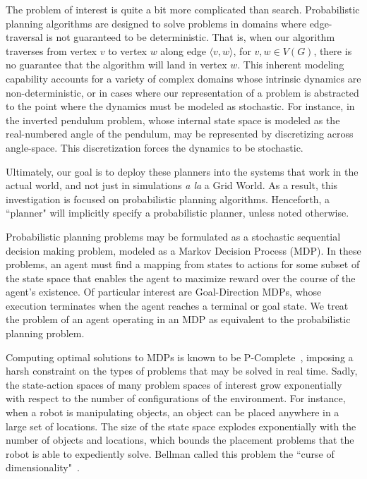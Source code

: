 \documentclass[11pt]{article}
\begin{document}
The problem of interest is quite a bit more complicated than search. Probabilistic planning algorithms are designed to solve problems in domains where edge-traversal is not guaranteed to be deterministic. That is, when our algorithm traverses from vertex $v$ to vertex $w$ along edge $\langle v,w \rangle$, for $v, w \in V(G)$, there is no guarantee that the algorithm will land in vertex $w$. This inherent modeling capability accounts for a variety of complex domains whose intrinsic dynamics are non-deterministic, or in cases where our representation of a problem is abstracted to the point where the dynamics must be modeled as stochastic. For instance, in the inverted pendulum problem, whose internal state space is modeled as the real-numbered angle of the pendulum, may be represented by discretizing across angle-space. This discretization forces the dynamics to be stochastic.

Ultimately, our goal is to deploy these planners into the systems that work in the actual world, and not just in simulations {\it a la} a Grid World. As a result, this investigation is focused on probabilistic planning algorithms. Henceforth, a ``planner" will implicitly specify a probabilistic planner, unless noted otherwise.

Probabilistic planning problems may be formulated as a stochastic sequential decision making problem, modeled as a Markov Decision Process (MDP). In these problems, an agent must find a mapping from states to actions for some subset of the state space that enables the agent to maximize reward over the course of the agent's existence. Of particular interest are Goal-Direction MDPs, whose execution terminates when the agent reaches a terminal or goal state. We treat the problem of an agent operating in an MDP as equivalent to the probabilistic planning problem.

Computing optimal solutions to MDPs is known to be P-Complete~\cite{littman1995complexity}, imposing a harsh constraint on the types of problems that may be solved in real time. Sadly, the state-action spaces of many problem spaces of interest grow exponentially with respect to the number of configurations of the environment.  For instance, when a robot is manipulating objects, an object can be placed anywhere in a large set of locations.  The size of the state space explodes exponentially with the number of objects and locations, which bounds the placement problems that the robot is able to expediently solve. Bellman called this problem the ``curse of dimensionality"~\cite{bellman1961adaptive}.
\end{document}
